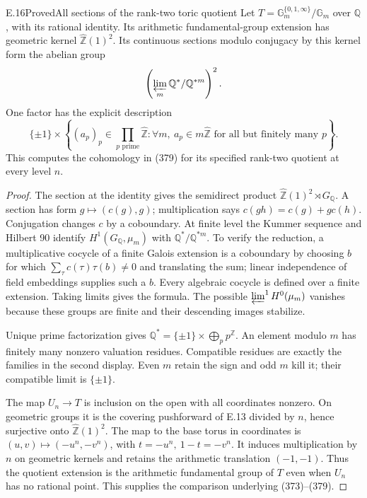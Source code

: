 \begin{statement}{E.16}{Proved}{All sections of the rank-two toric quotient}
Let $T=\mathbb G_m^{\{0,1,\infty\}}/\mathbb G_m$ over
$\mathbb Q$, with its rational identity. Its arithmetic
fundamental-group extension has geometric kernel
$\widehat{\mathbb Z}(1)^2$. Its continuous sections modulo
conjugacy by this kernel form the abelian group
\[
 \left(\varprojlim_m\mathbb Q^*/\mathbb Q^{*m}\right)^2.
\]
One factor has the explicit description
\[
 \{\pm1\}\times
 \left\{(a_p)_p\in\prod_{p\text{ prime}}\widehat{\mathbb Z}:
 \forall m,\ a_p\in m\widehat{\mathbb Z}
 \text{ for all but finitely many }p\right\}.
\]
This computes the cohomology in (379) for its specified
rank-two quotient at every level $n$.
\end{statement}
\begin{proof}
The section at the identity gives the semidirect product
$\widehat{\mathbb Z}(1)^2\rtimes G_{\mathbb Q}$.
A section has form $g\mapsto(c(g),g)$; multiplication says
$c(gh)=c(g)+g c(h)$. Conjugation changes $c$ by a
coboundary. At finite level the Kummer sequence and
Hilbert 90 identify $H^1(G_{\mathbb Q},\mu_m)$ with
$\mathbb Q^*/\mathbb Q^{*m}$. To verify the reduction,
a multiplicative cocycle of a finite Galois extension
is a coboundary by choosing $b$ for which
$\sum_\tau c(\tau)\tau(b)\ne0$ and translating the sum;
linear independence of field embeddings supplies such
a $b$. Every algebraic cocycle is defined over a finite
extension. Taking limits gives the formula. The possible
$\varprojlim^1 H^0(\mu_m)$ vanishes because these groups
are finite and their descending images stabilize.

Unique prime factorization gives
$\mathbb Q^*=\{\pm1\}\times\bigoplus_p p^{\mathbb Z}$.
An element modulo $m$ has finitely many nonzero valuation
residues. Compatible residues are exactly the families
in the second display. Even $m$ retain the sign and odd
$m$ kill it; their compatible limit is $\{\pm1\}$.

The map $U_n\to T$ is inclusion on the open with all
coordinates nonzero. On geometric groups it is the
covering pushforward of E.13 divided by $n$, hence
surjective onto $\widehat{\mathbb Z}(1)^2$. The map to
the base torus in coordinates is
$(u,v)\mapsto(-u^n,-v^n)$, with
$t=-u^n,\ 1-t=-v^n$. It induces multiplication by $n$
on geometric kernels and retains the arithmetic
translation $(-1,-1)$. Thus the quotient extension
is the arithmetic fundamental group of $T$ even
when $U_n$ has no rational point. This supplies
the comparison underlying (373)--(379).
\end{proof}

